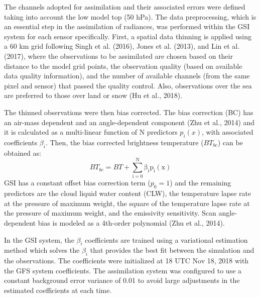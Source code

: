 \documentclass[12pt,twoside]{reedthesis}
\begin{document}
The channels adopted for assimilation and their associated errors were defined taking into account the low model top (50 hPa). The data preprocessing, which is an essential step in the assimilation of radiances, was performed within the GSI system for each sensor specifically. First, a spatial data thinning is applied using a 60 km grid following Singh et al. (2016), Jones et al. (2013), and Lin et al. (2017), where the observations to be assimilated are chosen based on their distance to the model grid points, the observation quality (based on available data quality information), and the number of available channels (from the same pixel and sensor) that passed the quality control. Also, observations over the sea are preferred to those over land or snow (Hu et al., 2018).

The thinned observations were then bias corrected. The bias correction (BC) has an air-mass dependent and an angle-dependent component (Zhu et al., 2014) and it is calculated as a multi-linear function of N predictors \(p_i(x)\), with associated coefficients \(\beta_i\). Then, the bias corrected brightness temperature (\(BT_{bc}\)) can be obtained as:
\begin{equation}
  \mathrm{\mathit{BT_{bc}} =\mathit{ BT} + \sum_{i = 0}^{N} \beta_i p_i (x)}
  \label{eq:eq12}
\end{equation}
GSI has a constant offset bias correction term (\(p_0 = 1\)) and the remaining predictors are the cloud liquid water content (CLW), the temperature lapse rate at the pressure of maximum weight, the square of the temperature lapse rate at the pressure of maximum weight, and the emissivity sensitivity. Scan angle-dependent bias is modeled as a 4th-order polynomial (Zhu et al., 2014).

In the GSI system, the \(\beta_i\) coefficients are trained using a variational estimation method which solves the \(\beta_i\) that provides the best fit between the simulation and the observations. The coefficients were initialized at 18 UTC Nov 18, 2018 with the GFS system coefficients. The assimilation system was configured to use a constant background error variance of 0.01 to avoid large adjustments in the estimated coefficients at each time.
\end{document}
